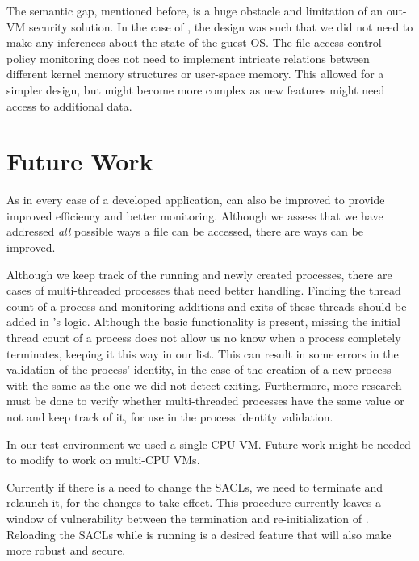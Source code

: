 \par The semantic gap, mentioned before, is a huge obstacle and limitation of an out-\ac{VM} security solution. In the case of , the design was such that we did not need to make any inferences about the state of the guest \ac{OS}. The file access control policy monitoring does not need to implement intricate relations between different kernel memory structures or user-space memory. This allowed for a simpler design, but might become more complex as new features might need access to additional data.

\section{Future Work}

\par As in every case of a developed application,  can also be improved to provide improved efficiency and better monitoring. Although we assess that we have addressed \emph{all} possible ways a file can be accessed, there are ways  can be improved.

\par Although we keep track of the running and newly created processes, there are cases of multi-threaded processes that need better handling. Finding the thread count of a process and monitoring additions and exits of these threads should be added in 's logic. Although the basic functionality is present, missing the initial thread count of a process does not allow us no know when a process completely terminates, keeping it this way in our list. This can result in some errors in the validation of the process' identity, in the case of the creation of a new process with the same  as the one we did not detect exiting. Furthermore, more research must be done to verify whether multi-threaded processes have the same  value or not and keep track of it, for use in the process identity validation.

\par In our test environment we used a single-\ac{CPU} \ac{VM}. Future work might be needed to modify  to work on multi-\ac{CPU} \acp{VM}. 

\par Currently if there is a need to change the \acp{SACL}, we need to terminate  and relaunch it, for the changes to take effect. This procedure currently leaves a window of vulnerability between the termination and re-initialization of . Reloading the \acp{SACL} while  is running is a desired feature that will also make  more robust and secure.

